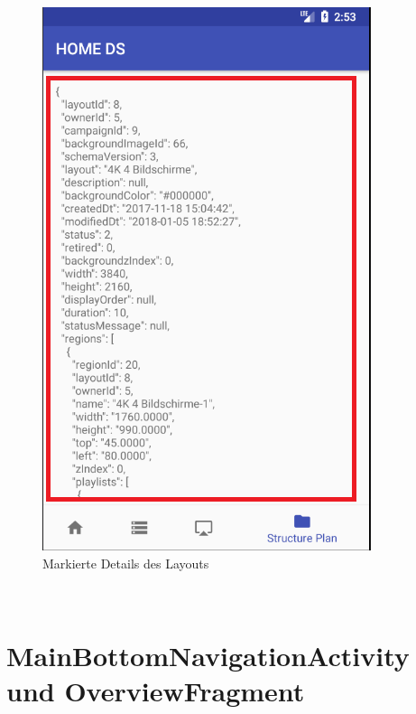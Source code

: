 \begin{figure}[H]
\centering
\includegraphics[scale=0.35]{images/06_AndroidApp/06_StructureDetail}
\caption{Markierte Details des Layouts}
\label{fig:06_StructureDetail}
\end{figure}
\\
\section{MainBottomNavigationActivity und OverviewFragment}
